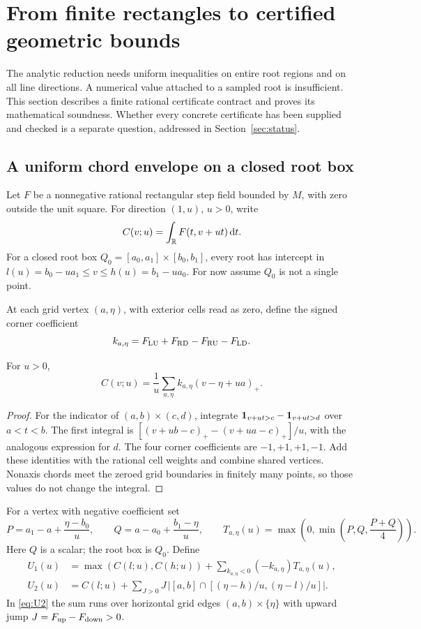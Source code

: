 \section{From finite rectangles to certified geometric bounds}\label{sec:certificates}

The analytic reduction needs uniform inequalities on entire root
regions and on all line directions. A numerical value attached to a
sampled root is insufficient. This section describes a finite
rational certificate contract and proves its mathematical soundness.
Whether every concrete certificate has been supplied and checked is
a separate question, addressed in Section~\ref{sec:status}.

\subsection{A uniform chord envelope on a closed root box}
Let \(F\) be a nonnegative rational rectangular step field bounded by
\(M\), with zero outside the unit square. For direction \((1,u)\),
\(u>0\), write
\[
 C(v;u)=\int_\mathbb R F(t,v+ut)\,\mathrm d t.
\]
For a closed root box \(Q_0=[a_0,a_1]\times[b_0,b_1]\), every root
has intercept in
\(l(u)=b_0-u a_1\le v\le h(u)=b_1-u a_0\).
For now assume \(Q_0\) is not a single point.

At each grid vertex \((a,\eta)\), with exterior cells read as zero,
define the signed corner coefficient
\[
 k_{a,\eta}=F_{\rm LU}+F_{\rm RD}-F_{\rm RU}-F_{\rm LD}.
\]
\begin{lemma}\label{lem:corners}
For \(u>0\),
\begin{equation}\label{eq:corners}
 C(v;u)=\frac1u\sum_{a,\eta} k_{a,\eta}(v-\eta+ua)_+.
\end{equation}
\end{lemma}
\begin{proof}
For the indicator of \((a,b)\times(c,d)\), integrate
\(\mathbf 1_{v+ut>c}-\mathbf 1_{v+ut>d}\) over \(a<t<b\).
The first integral is
\([(v+ub-c)_+-(v+ua-c)_+]/u\), with the analogous expression
for \(d\). The four corner coefficients are \(-1,+1,+1,-1\).
Add these identities with the rational cell weights and combine
shared vertices. Nonaxis chords meet the zeroed grid boundaries
in finitely many points, so those values do not change the integral.
\end{proof}

For a vertex with negative coefficient set
\[
 P=a_1-a+\frac{\eta-b_0}{u},\qquad
 Q=a-a_0+\frac{b_1-\eta}{u},\qquad
 T_{a,\eta}(u)=\max\left(0,\min\left(P,Q,\frac{P+Q}{4}\right)\right).
\]
Here \(Q\) is a scalar; the root box is \(Q_0\).
Define
\begin{align}
 U_1(u)&=\max(C(l;u),C(h;u))+
             \sum_{k_{a,\eta}<0}(-k_{a,\eta})T_{a,\eta}(u),
             \label{eq:U1}\\
 U_2(u)&=C(l;u)+\sum_{J>0}J\,
       \big|[a,b]\cap[(\eta-h)/u,(\eta-l)/u]\big|.
       \label{eq:U2}
\end{align}
In \eqref{eq:U2} the sum runs over horizontal grid edges
\((a,b)\times\{\eta\}\) with upward jump
\(J=F_{\rm up}-F_{\rm down}>0\).

